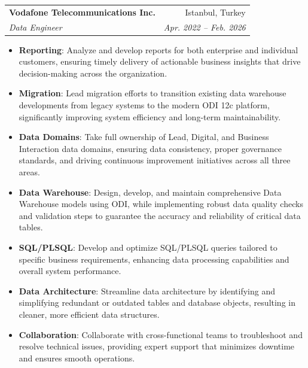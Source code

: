 \documentclass[letterpaper,11pt]{article}
\makeatletter
\newcommand{\resumeItem}[2]{
  \item\small{
    \textbf{#1}{: #2 \vspace{-2pt}}
  }
}
\newcommand{\resumeSubheading}[4]{
  \vspace{-1pt}\item
    \begin{tabular*}{0.97\textwidth}[t]{l@{\extracolsep{\fill}}r}
      \textbf{#1} & #2 \\
      \textit{\small#3} & \textit{\small #4} \\
    \end{tabular*}\vspace{-5pt}
}
\newcommand{\resumeItemListStart}{\begin{itemize}}
\newcommand{\resumeItemListEnd}{\end{itemize}\vspace{-5pt}}
\makeatother
\begin{document}
    \resumeSubheading
      {Vodafone Telecommunications Inc.}{Istanbul, Turkey}
      {Data Engineer}{Apr. 2022 -- Feb. 2026}
      \resumeItemListStart
        \resumeItem{Reporting}
          {Analyze and develop reports for both enterprise and individual customers, ensuring timely delivery of actionable business insights that drive decision-making across the organization.}
        \resumeItem{Migration}
          {Lead migration efforts to transition existing data warehouse developments from legacy systems to the modern ODI 12c platform, significantly improving system efficiency and long-term maintainability.}
        \resumeItem{Data Domains}
          {Take full ownership of Lead, Digital, and Business Interaction data domains, ensuring data consistency, proper governance standards, and driving continuous improvement initiatives across all three areas.}
        \resumeItem{Data Warehouse}
          {Design, develop, and maintain comprehensive Data Warehouse models using ODI, while implementing robust data quality checks and validation steps to guarantee the accuracy and reliability of critical data tables.}
        \resumeItem{SQL/PLSQL}
          {Develop and optimize SQL/PLSQL queries tailored to specific business requirements, enhancing data processing capabilities and overall system performance.}
        \resumeItem{Data Architecture}
          {Streamline data architecture by identifying and simplifying redundant or outdated tables and database objects, resulting in cleaner, more efficient data structures.}
        \resumeItem{Collaboration}
          {Collaborate with cross-functional teams to troubleshoot and resolve technical issues, providing expert support that minimizes downtime and ensures smooth operations.}
      \resumeItemListEnd
\end{document}
